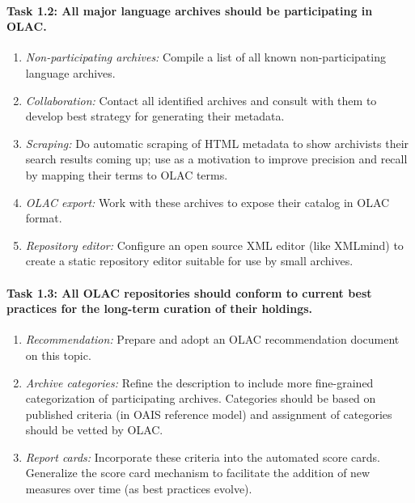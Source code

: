 \def\task{1.2}
\paragraph{Task {\task}: All major language archives should be participating in OLAC.}

\begin{enumerate}[label=\emph{\task\alph*}]
\item \emph{Non-participating archives:}
  Compile a list of all known non-participating language archives.
\item \emph{Collaboration:}
  Contact all identified archives and consult with them to develop best
  strategy for generating their metadata.
\item \emph{Scraping:}
  Do automatic scraping of HTML metadata to show archivists
  their search results coming up; use as a motivation to improve precision
  and recall by mapping their terms to OLAC terms.
\item \emph{OLAC export:}
  Work with these archives to expose their catalog in OLAC format.
\item \emph{Repository editor:}
  Configure an open source XML editor (like XMLmind) to create a static repository editor
  suitable for use by small archives.
\end{enumerate}

\def\task{1.3}
\paragraph{Task {\task}: All OLAC repositories should conform to current best practices
      for the long-term curation of their holdings.}

\begin{enumerate}[label=\emph{\task\alph*}]
\item \emph{Recommendation:}
  Prepare and adopt an OLAC recommendation document on this topic.
\item \emph{Archive categories:}
  Refine the {\tt <olac-archive>} description to include
  more fine-grained categorization of participating archives.
  Categories should be based on published criteria (in OAIS reference model)
  and assignment of categories should be vetted by OLAC.
\item \emph{Report cards:}
  Incorporate these criteria into the automated score cards.
  Generalize the score card mechanism to facilitate the addition
  of new measures over time (as best practices evolve).
\end{enumerate}

